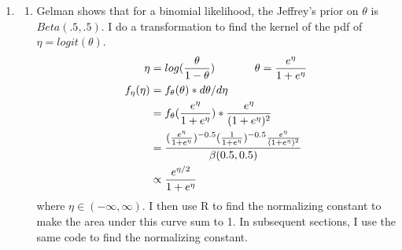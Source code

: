 \documentclass[12pt]{article}\usepackage[]{graphicx}\usepackage[]{color}
\newenvironment{knitrout}{}{} %
\begin{document}
\begin{doublespacing}
\begin{enumerate}
\begin{enumerate}
\begin{knitrout}
\end{knitrout}


\end{enumerate}

\item \begin{enumerate}
\item Gelman shows that for a binomial likelihood, the Jeffrey's prior on $\theta$ is $Beta(.5, .5)$. I do a transformation to find the kernel of the pdf of $\eta = logit(\theta)$.
\begin{align*}
\eta &= log(\frac{\theta}{1-\theta}) \hspace{.5in} \theta = \frac{e^{\eta}}{1+e^{\eta}} \\
f_{\eta}(\eta) &= f_{\theta}(\theta)*d\theta/d\eta \\
&= f_{\theta}(\frac{e^{\eta}}{1+e^{\eta}})*\frac{e^{\eta}}{(1+e^{\eta})^2} \\
&= \frac{(\frac{e^{\eta}}{1+e^{\eta}})^{-0.5}(\frac{1}{1+e^{\eta}})^{-0.5}\frac{e^{\eta}}{(1+e^{\eta})^2}}{\beta(0.5, 0.5)} \\
&\propto \frac{e^{\eta/2}}{1+e^{\eta}}
\end{align*}
where $\eta \in (-\infty, \infty)$. I then use R to find the normalizing constant to make the area under this curve sum to 1. In subsequent sections, I use the same code to find the normalizing constant.


\end{enumerate}
\end{enumerate}
\end{doublespacing}
\end{document}
